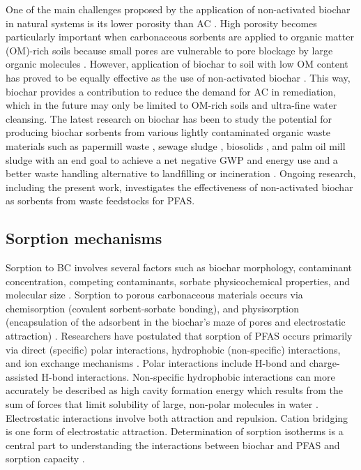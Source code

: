 One of the main challenges proposed by the application of non-activated biochar in natural systems is its lower porosity than AC \citep{leng2021overview}. High porosity becomes particularly important when carbonaceous sorbents are applied to organic matter (OM)-rich soils because small pores are vulnerable to pore blockage by large organic molecules \citep{Sorengard2019}. However, application of biochar to soil with low OM content has proved to be equally effective as the use of non-activated biochar \citep{Alhashimi2017}. This way, biochar provides a contribution to reduce the demand for AC in remediation, which in the future may only be limited to OM-rich soils and ultra-fine water cleansing. The latest research on biochar has been to study the potential for producing biochar sorbents from various lightly contaminated organic waste materials such as papermill waste \citep{van2010effects}, sewage sludge \citep{fathianpour2018lead}, biosolids \citep{wang2011}, and palm oil mill sludge \citep{lam2017adsorption} with an end goal to achieve a net negative GWP and energy use and a better waste handling alternative to landfilling or incineration \citep{Alhashimi2017}. Ongoing research, including the present work, investigates the effectiveness of non-activated biochar as sorbents from waste feedstocks for PFAS. 

\subsection{Sorption mechanisms}\label{sec:mechanisms}
Sorption to BC involves several factors such as biochar morphology, contaminant concentration, competing contaminants, sorbate physicochemical properties, and molecular size \citep{Li2019,du2014adsorption}. Sorption to porous carbonaceous materials occurs via chemisorption (covalent sorbent-sorbate bonding), and physisorption (encapsulation of the adsorbent in the biochar's maze of pores and electrostatic attraction) \citep{Li2019}. Researchers have postulated that sorption of PFAS occurs primarily via direct (specific) polar interactions, hydrophobic (non-specific) interactions, and ion exchange mechanisms \citep{Hale2017fire,yu2009sorption}. Polar interactions include H-bond and charge-assisted H-bond interactions. Non-specific hydrophobic interactions can more accurately be described as high cavity formation energy which results from the sum of forces that limit solubility of large, non-polar molecules in water \citep{Arp2006,sigmund2022sorption}. Electrostatic interactions involve both attraction and repulsion. Cation bridging is one form of electrostatic attraction. Determination of sorption isotherms is a central part to understanding the interactions between biochar and PFAS and sorption capacity \citep{yu2009sorption,Li2019}.

